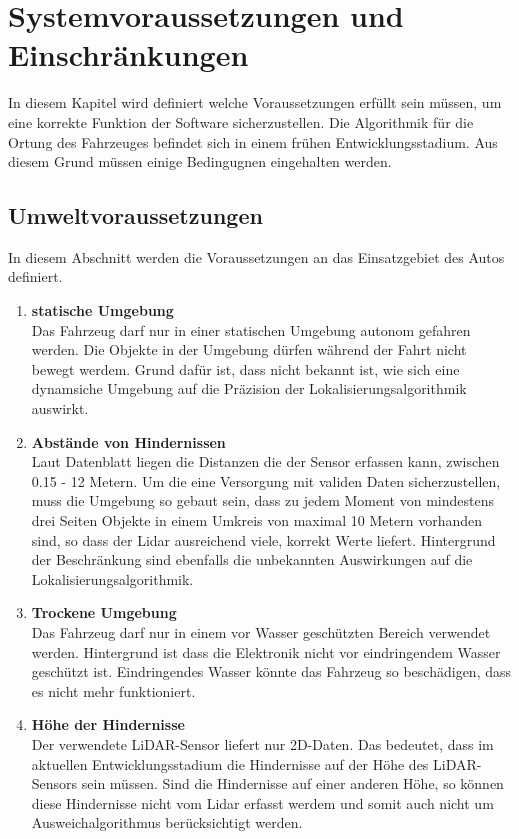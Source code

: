\section{Systemvoraussetzungen und Ein\-schränkungen}
In diesem Kapitel wird definiert welche Voraussetzungen erfüllt sein müssen, um eine korrekte Funktion der Software sicherzustellen.
Die Algorithmik für die Ortung des Fahrzeuges befindet sich in einem frühen Entwicklungsstadium. 
Aus diesem Grund müssen einige Bedingugnen eingehalten werden. 
\subsection{Umweltvoraussetzungen}
In diesem Abschnitt werden die Voraussetzungen an das Einsatzgebiet des Autos definiert.
\begin{enumerate}[leftmargin=*]
    \item \textbf{statische Umgebung} \\
    Das Fahrzeug darf nur in einer statischen Umgebung autonom gefahren werden. 
    Die Objekte in der Umgebung dürfen während der Fahrt nicht bewegt werdem.
    Grund dafür ist, dass nicht bekannt ist, wie sich eine dynamsiche Umgebung auf die Präzision der Lokalisierungsalgorithmik auswirkt. 
    \item \textbf{Abstände von Hindernissen}\\
    \label{LiDAR-Daten}
    Laut Datenblatt \cite{Slamtec2020} liegen die Distanzen die der Sensor erfassen kann, zwischen 0.15 - 12 Metern.
    Um die eine Versorgung mit validen Daten sicherzustellen, 
    muss die Umgebung so gebaut sein, 
    dass zu jedem Moment von mindestens drei Seiten Objekte in einem Umkreis von maximal 10 Metern vorhanden sind,
    so dass der Lidar ausreichend viele, korrekt Werte liefert.  
    Hintergrund der Beschränkung sind ebenfalls die unbekannten Auswirkungen auf die Lokalisierungsalgorithmik.
    \item \textbf{Trockene Umgebung}\\
    Das Fahrzeug darf nur in einem vor Wasser geschützten Bereich verwendet werden.
    Hintergrund ist dass die Elektronik nicht vor eindringendem Wasser geschützt ist.
    Eindringendes Wasser könnte das Fahrzeug so beschädigen, dass es nicht mehr funktioniert.
    \item \textbf{Höhe der Hindernisse}\\
    Der verwendete LiDAR-Sensor liefert nur 2D-Daten. 
    Das bedeutet, dass im aktuellen Entwicklungsstadium die Hindernisse auf der Höhe des LiDAR-Sensors sein müssen.
    Sind die Hindernisse auf einer anderen Höhe, so können diese Hindernisse nicht vom Lidar erfasst werdem 
    und somit auch nicht um Ausweichalgorithmus berücksichtigt werden.
\end{enumerate}



